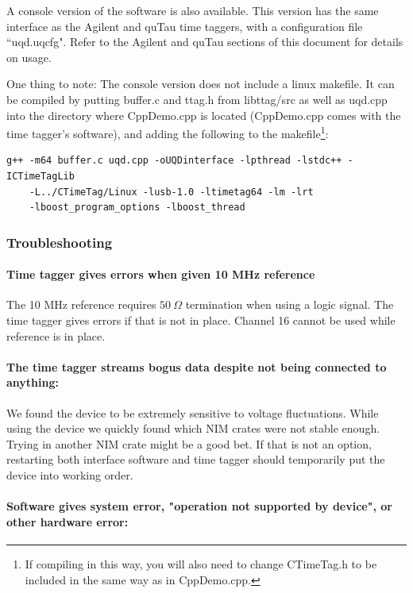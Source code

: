 \documentclass[10pt]{article}
\begin{document}
A console version of the software is also available. This version has the same interface as the Agilent and quTau
time taggers, with a configuration file ``uqd.uqcfg". Refer to the Agilent and quTau sections of this
document for details on usage.

One thing to note: The console version does not include a linux makefile. It can be compiled by
putting buffer.c and ttag.h from libttag/src as well as uqd.cpp into the directory where CppDemo.cpp is located
(CppDemo.cpp comes with the time tagger's software), and 
adding the following to the makefile\footnote{If compiling in this way, you will also need to change CTimeTag.h to be included in the same way as in CppDemo.cpp.}: 

\begin{verbatim}
g++ -m64 buffer.c uqd.cpp -oUQDinterface -lpthread -lstdc++ -ICTimeTagLib 
	-L../CTimeTag/Linux -lusb-1.0 -ltimetag64 -lm -lrt 
	-lboost_program_options -lboost_thread 
\end{verbatim}

\subsubsection{Troubleshooting}
\paragraph{Time tagger gives errors when given 10 MHz reference}
The 10 MHz reference requires $50\ \Omega$ termination when using a logic signal. The time tagger gives errors if
that is not in place. Channel 16 cannot be used while reference is in place.

\paragraph{The time tagger streams bogus data despite not being connected to anything:}

We found the device to be extremely sensitive to voltage fluctuations. While using the device we quickly
found which NIM crates were not stable enough. Trying in another NIM crate might be a good bet. If
that is not an option, restarting
both interface software and time tagger should temporarily put the device into working order.

\paragraph{Software gives system error, "operation not supported by device", or other hardware error:}
\end{document}
